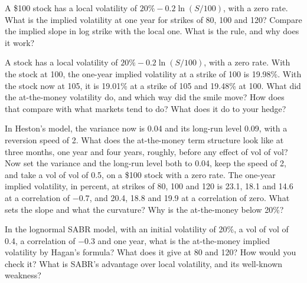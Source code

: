 \begin{question}\label{iq:iv2:vol-surface-and-vol-trading:29}
A \$100 stock has a local volatility of $20\% - 0.2\ln(S/100)$, with a zero rate. What is the implied volatility at one year for strikes of 80, 100 and 120? Compare the implied slope in log strike with the local one. What is the rule, and why does it work?
\end{question}

\begin{question}\label{iq:iv2:vol-surface-and-vol-trading:30}
A stock has a local volatility of $20\% - 0.2\ln(S/100)$, with a zero rate. With the stock at 100, the one-year implied volatility at a strike of 100 is 19.98\%. With the stock now at 105, it is 19.01\% at a strike of 105 and 19.48\% at 100. What did the at-the-money volatility do, and which way did the smile move? How does that compare with what markets tend to do? What does it do to your hedge?
\end{question}

\begin{question}\label{iq:iv2:vol-surface-and-vol-trading:31}
In Heston's model, the variance now is 0.04 and its long-run level 0.09, with a reversion speed of 2. What does the at-the-money term structure look like at three months, one year and four years, roughly, before any effect of vol of vol? Now set the variance and the long-run level both to 0.04, keep the speed of 2, and take a vol of vol of 0.5, on a \$100 stock with a zero rate. The one-year implied volatility, in percent, at strikes of 80, 100 and 120 is 23.1, 18.1 and 14.6 at a correlation of $-0.7$, and 20.4, 18.8 and 19.9 at a correlation of zero. What sets the slope and what the curvature? Why is the at-the-money below 20\%?
\end{question}

\begin{question}\label{iq:iv2:vol-surface-and-vol-trading:32}
In the lognormal SABR model, with an initial volatility of 20\%, a vol of vol of 0.4, a correlation of $-0.3$ and one year, what is the at-the-money implied volatility by Hagan's formula? What does it give at 80 and 120? How would you check it? What is SABR's advantage over local volatility, and its well-known weakness?
\end{question}

